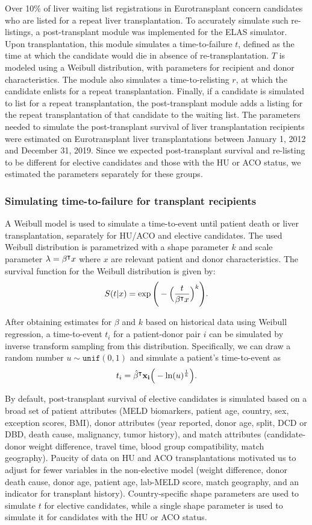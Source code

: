 \documentclass[11pt,twoside,]{book}
\newcommand\T{{\hspace{-.25pt}\intercal}}
\begin{document}
Over 10\% of liver waiting list registrations in Eurotransplant concern
candidates who are listed for a repeat liver transplantation. To
accurately simulate such re-listings, a post-transplant module was
implemented for the ELAS simulator. Upon transplantation, this
module simulates a time-to-failure \(t\), defined as the time at which the
candidate would die in absence of re-transplantation. \(T\) is modeled using
a Weibull distribution, with parameters for recipient and donor characteristics.
The module also simulates a time-to-relisting \(r\), at which the candidate
enlists for a repeat transplantation.
Finally, if a candidate is simulated to list for a repeat transplantation,
the post-transplant module adds a listing for the repeat transplantation of
that candidate to the waiting list.
\newpage
The parameters needed to simulate the post-transplant survival of liver transplantation
recipients were estimated on Eurotransplant liver transplantations between January 1, 2012
and December 31, 2019. Since we expected post-transplant survival and re-listing to
be different for elective candidates and those with the HU or ACO status, we estimated the
parameters separately for these groups.

\subsubsection{Simulating time-to-failure for transplant recipients}\label{sec:elassimposttxp}

A Weibull model is used to simulate a time-to-event until patient death or
liver transplantation, separately for HU/ACO and elective candidates.
The used Weibull distribution is parametrized with a shape
parameter \(k\) and scale parameter
\(\lambda = \beta^{\T}x\) where \(x\) are relevant patient and
donor characteristics. The survival function for the Weibull distribution is given by:
\[S(t|x) = \exp\Bigg(-\Big(\frac{t}{\beta^{\T}x}\Big)^k\Bigg).\]

After
obtaining estimates for \(\beta\) and \(k\) based on historical data using Weibull
regression, a time-to-event \(t_i\) for a patient-donor pair \(i\) can be simulated by inverse transform sampling from this distribution. Specifically, we can draw a random
number \(u \sim \texttt{unif}(0,1)\) and simulate a patient's
time-to-event as
\[t_i = \hat{\mathbf{\beta}}^{\T} \mathbf{x_i} \Big(-\ln(u)^{\frac{1}{k}}\Big).\]

By default, post-transplant survival of elective candidates is simulated based
on a broad set of patient attributes (MELD biomarkers, patient age, country, sex, exception
scores, BMI), donor attributes (year reported, donor age, split, DCD or DBD, death cause,
malignancy, tumor history), and match attributes (candidate-donor weight difference, travel time,
blood group compatibility, match geography). Paucity of data on HU and ACO transplantations
motivated us to adjust for fewer variables in the non-elective model (weight difference,
donor death cause, donor age, patient age, lab-MELD score, match geography, and an
indicator for transplant history). Country-specific shape parameters are used to simulate \(t\) for elective
candidates, while a single shape parameter is used to simulate it for candidates
with the HU or ACO status.
\newpage
\end{document}
